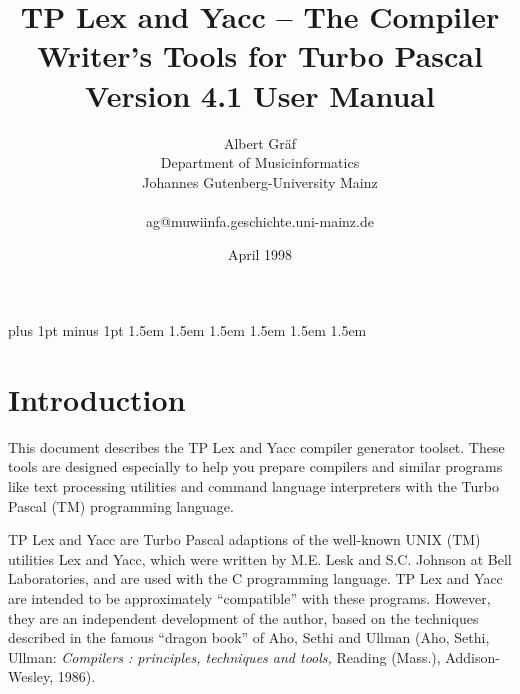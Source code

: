 

\title{TP Lex and Yacc -- The Compiler Writer's Tools for Turbo Pascal\\
       Version 4.1 User Manual}

\author{Albert Gr\"af\\
        Department of Musicinformatics\\
        Johannes Gutenberg-University Mainz\\
        \\
        ag@muwiinfa.geschichte.uni-mainz.de}

\date{April 1998}

\setlength{\topmargin}{0cm}
\setlength{\oddsidemargin}{0cm}
\setlength{\evensidemargin}{0cm}
\setlength{\textwidth}{16cm}
\setlength{\textheight}{21cm}
\parskip=4pt plus 1pt minus 1pt
\itemsep=0pt
\renewcommand{\baselinestretch}{1.1}
\unitlength=1mm
\leftmargini 1.5em
\leftmarginii 1.5em \leftmarginiii 1.5em \leftmarginiv 1.5em \leftmarginv 1.5em
\leftmarginvi 1.5em



\maketitle

\tableofcontents

\section{Introduction}

This document describes the TP Lex and Yacc compiler generator toolset.
These tools are designed especially to help you prepare compilers and
similar programs like text processing utilities and command language
interpreters with the Turbo Pascal (TM) programming language.

TP Lex and Yacc are Turbo Pascal adaptions of the well-known UNIX (TM)
utilities Lex and Yacc, which were written by M.E. Lesk and S.C. Johnson
at Bell Laboratories, and are used with the C programming language. TP Lex
and Yacc are intended to be approximately ``compatible'' with these programs.
However, they are an independent development of the author, based on the
techniques described in the famous ``dragon book'' of Aho, Sethi and Ullman
(Aho, Sethi, Ullman: {\em Compilers : principles, techniques and tools,\/}
Reading (Mass.), Addison-Wesley, 1986).


